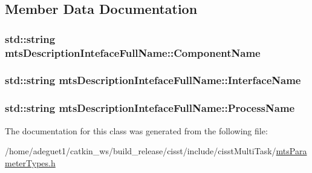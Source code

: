 \subsection{Member Data Documentation}
\hypertarget{classmts_description_inteface_full_name_aada456d08c4d1d0bddba60467c01afaa}{
\subsubsection[{Component\-Name}]{\setlength{\rightskip}{0pt plus 5cm}std\-::string mts\-Description\-Inteface\-Full\-Name\-::\-Component\-Name}}\label{classmts_description_inteface_full_name_aada456d08c4d1d0bddba60467c01afaa}
\hypertarget{classmts_description_inteface_full_name_a5e31c5ab84fe29944b89730608d83f7e}{
\subsubsection[{Interface\-Name}]{\setlength{\rightskip}{0pt plus 5cm}std\-::string mts\-Description\-Inteface\-Full\-Name\-::\-Interface\-Name}}\label{classmts_description_inteface_full_name_a5e31c5ab84fe29944b89730608d83f7e}
\hypertarget{classmts_description_inteface_full_name_a689aee0b2ad1499297717465e612daef}{
\subsubsection[{Process\-Name}]{\setlength{\rightskip}{0pt plus 5cm}std\-::string mts\-Description\-Inteface\-Full\-Name\-::\-Process\-Name}}\label{classmts_description_inteface_full_name_a689aee0b2ad1499297717465e612daef}


The documentation for this class was generated from the following file\-:\begin{DoxyCompactItemize}
\item 
/home/adeguet1/catkin\-\_\-ws/build\-\_\-release/cisst/include/cisst\-Multi\-Task/\hyperlink{mts_parameter_types_8h}{mts\-Parameter\-Types.\-h}\end{DoxyCompactItemize}
